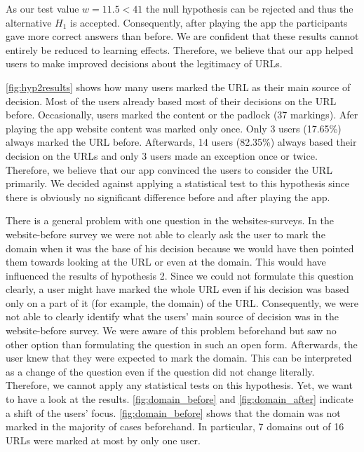 \begin{description}[leftmargin=0cm]
As our test value $w = 11.5 < 41$ the null hypothesis can be rejected and thus the alternative $H_{1}$ is accepted.
Consequently, after playing the app the participants gave more correct answers than before.
We are confident that these results cannot entirely be reduced to learning effects.
Therefore, we believe that our app helped users to make improved decisions about the legitimacy of URLs.
\item[Hypothesis 2:]
\autoref{fig:hyp2results} shows how many users marked the URL as their main source of decision.
Most of the users already based most of their decisions on the URL before.
Occasionally, users marked the content or the padlock (37 markings).
Afer playing the app website content was marked only once.
Only 3 users (17.65\%) always marked the URL before.
Afterwards, 14 users (82.35\%) always based their decision on the URLs and only 3 users made an exception once or twice.
Therefore, we believe that our app convinced the users to consider the URL primarily.
We decided against applying a statistical test to this hypothesis since there is obviously no significant difference before and after playing the app.
\item[Hypothesis 3:]
There is a general problem with one question in the websites-surveys.
In the website-before survey we were not able to clearly ask the user to mark the domain when it was the base of his decision because we would have then pointed them towards looking at the URL or even at the domain.
This would have influenced the results of hypothesis 2.
Since we could not formulate this question clearly, a user might have marked the whole URL even if his decision was based only on a part of it (for example, the domain) of the URL.
Consequently, we were not able to clearly identify what the users' main source of decision was in the website-before survey.
We were aware of this problem beforehand but saw no other option than formulating the question in such an open form.
Afterwards, the user knew that they were expected to mark the domain.
This can be interpreted as a change of the question even if the question did not change literally.
Therefore, we cannot apply any statistical tests on this hypothesis.
Yet, we want to have a look at the results.
\autoref{fig:domain_before} and \autoref{fig:domain_after} indicate a shift of the users' focus.
\autoref{fig:domain_before} shows that the domain was not marked in the majority of cases beforehand. In particular, 7 domains out of 16 URLs were marked at most by only one user.
\begin{figure}

\end{figure}
\end{description}
